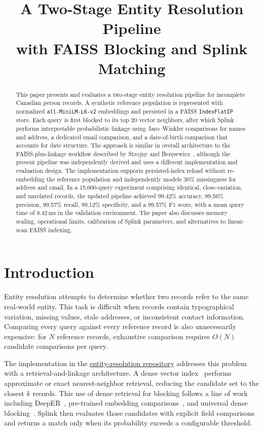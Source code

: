 \documentclass[conference]{IEEEtran}
\title{A Two-Stage Entity Resolution Pipeline\\with FAISS Blocking and Splink Matching}
\author{\IEEEauthorblockN{Denis Robert}\IEEEauthorblockA{\textit{Independent Researcher}}}
\begin{document}
\maketitle

\begin{abstract}
This paper presents and evaluates a two-stage entity resolution pipeline for incomplete Canadian person records. A synthetic reference population is represented with normalized \texttt{all-MiniLM-L6-v2} embeddings and persisted in a FAISS \texttt{IndexFlatIP} store. Each query is first blocked to its top 20 vector neighbors, after which Splink performs interpretable probabilistic linkage using Jaro--Winkler comparisons for names and address, a dedicated email comparison, and a date-of-birth comparison that accounts for date structure. The approach is similar in overall architecture to the FAISS-plus-linkage workflow described by Strojny and Ber\k{e}sewicz~\cite{strojny2026}, although the present pipeline was independently derived and uses a different implementation and evaluation design. The implementation supports persisted-index reload without re-embedding the reference population and independently models 30\% missingness for address and email. In a 15,000-query experiment comprising identical, close-variation, and unrelated records, the updated pipeline achieved 99.42\% accuracy, 99.56\% precision, 99.57\% recall, 99.12\% specificity, and a 99.57\% F1 score, with a mean query time of 8.42\,ms in the validation environment. The paper also discusses memory scaling, operational limits, calibration of Splink parameters, and alternatives to linear-scan FAISS indexing.
\end{abstract}

\section{Introduction}
Entity resolution attempts to determine whether two records refer to the same real-world entity. This task is difficult when records contain typographical variation, missing values, stale addresses, or inconsistent contact information. Comparing every query against every reference record is also unnecessarily expensive: for $N$ reference records, exhaustive comparison requires $O(N)$ candidate comparisons per query.

The implementation in the \href{https://github.com/denisrobert/entity-resolution}{entity-resolution repository} addresses this problem with a retrieval-and-linkage architecture. A dense vector index~\cite{johnson2019} performs approximate or exact nearest-neighbor retrieval, reducing the candidate set to the closest $k$ records. This use of dense retrieval for blocking follows a line of work including DeepER~\cite{ebreheem2018}, pre-trained embedding comparisons~\cite{zeakis2023}, and universal dense blocking~\cite{wang2024}. Splink then evaluates those candidates with explicit field comparisons and returns a match only when its probability exceeds a configurable threshold.
\end{document}
